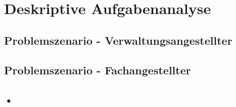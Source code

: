 \chapter{Deskriptive Aufgabenanalyse}


\section{Problemszenario - Verwaltungsangestellter}

\section{Problemszenario - Fachangestellter}

\section{•}